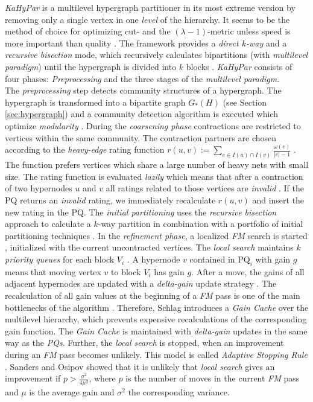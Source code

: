 \emph{KaHyPar} is a multilevel hypergraph partitioner in its most extreme version by
removing only a single vertex in one \emph{level} of the hierarchy. It seems to be the method
of choice for optimizing cut- and the $(\lambda - 1)$-metric unless speed is more important than
quality \cite{heuer2017improving}. The framework provides a \emph{direct $k$-way} \cite{akhremtsev2017engineering} 
and a \emph{recursive bisection} mode, which recursively calculates bipartitions 
(with \emph{multilevel paradigm}) until the hypergraph is divided into $k$ blocks 
\cite{schlag2016k}. \emph{KaHyPar} consists of four phases: \emph{Preprocessing}
and the three stages of the \emph{multilevel paradigm}. \\
The \emph{preprocessing} step detects community structures of a hypergraph. The
hypergraph is transformed into a bipartite graph $G_*(H)$ (see Section \ref{sec:hypergraph}) and
a community detection algorithm is executed which optimize \emph{modularity} \cite{fortunato2010community,
heuer2017improving}. During the \emph{coarsening phase} contractions are restricted to vertices within the same 
community. The contraction partners are chosen according to the \emph{heavy-edge} rating function
$r(u,v) := \sum_{e \in I(u) \cap I(v)} \frac{\omega(e)}{|e|-1}$ \cite{karypis1999multilevel}. The
function prefers vertices which share a large number of heavy nets with small size. The rating
function is evaluated \emph{lazily} which means that after a contraction of two hypernodes $u$ and
$v$ all ratings related to those vertices are \emph{invalid} \cite{schlag2016k}. If the PQ returns
an \emph{invalid} rating, we immediately recalculate $r(u,v)$ and insert the new rating in the
PQ. The \emph{initial partitioning} uses the \emph{recursive bisection} approach to calculate
a $k$-way partition in combination with a portfolio of initial partitioning techniques 
\cite{heuer2015engineering}. In the \emph{refinement phase}, a localized \emph{FM} search is started \cite{fiduccia1988linear},
initialized with the current uncontracted vertices. The \emph{local search} maintains $k$ \emph{priority
queues} for each block $V_i$ \cite{akhremtsev2017engineering}. A hypernode $v$ contained in 
$\text{PQ}_i$ with gain $g$ means that moving vertex $v$ to block $V_i$ has gain $g$. After a move,
the gains of all adjacent hypernodes are updated with a \emph{delta-gain} update strategy \cite{papa2007hypergraph}.
The recalculation of all gain values at the beginning of a \emph{FM} pass is one of the main bottlenecks
of the algorithm \cite{papa2007hypergraph}. Therefore, Schlag \cite{akhremtsev2017engineering,
schlag2016k} introduces a \emph{Gain Cache} over the multilevel hierarchy, which prevents
expensive recalculations of the corresponding gain function. The \emph{Gain Cache} is maintained
with \emph{delta-gain} updates in the same way as the \emph{PQs}. Further, the \emph{local search}
is stopped, when an improvement during an \emph{FM} pass becomes unlikely. This model is
called \emph{Adaptive Stopping Rule} \cite{akhremtsev2017engineering}. Sanders and
Osipov \cite{osipov2010n} showed that it is unlikely that \emph{local search} gives an improvement if
$p > \frac{\sigma^2}{4\mu^2}$, where $p$ is the number of moves in the current \emph{FM} pass
and $\mu$ is the average gain and $\sigma^2$ the corresponding variance.